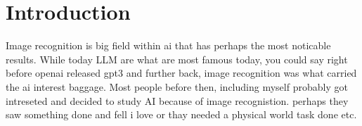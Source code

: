 \chapter{Introduction}
Image recognition is big field within ai that has perhaps the most noticable results. While today LLM are what are most famous today, you could say right before openai released gpt3 and further back, image recognition was what carried the ai interest baggage. Most people before then, including myself probably got intreseted and decided to study AI because of image recognistion. perhaps they saw something done and fell i love or thay needed a physical world task done etc.

